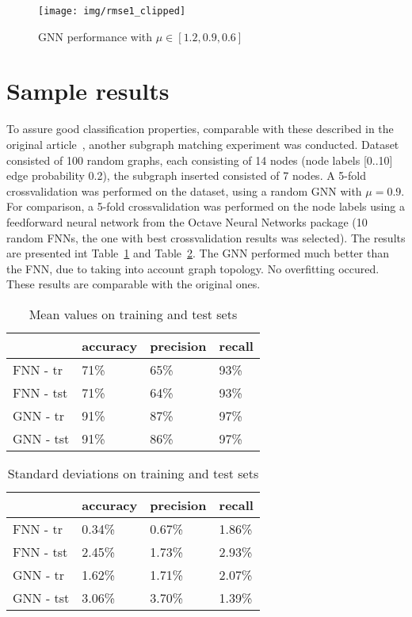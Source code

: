 \documentclass[]{spie}  %
\begin{document}
\begin{figure}
\begin{center}
	\texttt{[image: img/rmse1\_clipped]}
	\caption{GNN performance with $\mu \in [1.2, 0.9, 0.6]$}
	\label{fig:rmse}
\end{center}
\end{figure}

\section{Sample results}
To assure good classification properties, comparable with these described in the original article~\cite{scarselli2009graph}, another subgraph matching experiment was conducted. Dataset consisted of 100 random graphs, each consisting of 14 nodes (node labels [0..10] edge probability 0.2), the subgraph inserted consisted of 7 nodes. A 5-fold crossvalidation was performed on the dataset, using a random GNN with $\mu = 0.9$. For comparison, a 5-fold crossvalidation was performed on the node labels using a feedforward neural network from the Octave Neural Networks package (10 random FNNs, the one with best crossvalidation results was selected). The results are presented int Table~\ref{tab:crossmean} and Table~\ref{tab:crossstd}. The GNN performed much better than the FNN, due to taking into account graph topology. No overfitting occured. These results are comparable with the original ones.

\begin{table}[h!]
	\begin{center}
	\begin{tabular}{llll}
	\toprule
	& accuracy & precision & recall \\
	\midrule
	FNN - tr &	71\% &  65\% & 93\% \\
	FNN - tst &	71\% &  64\% &  93\% \\
	GNN - tr &	91\% &  87\%&  97\% \\
	GNN - tst &	91\% &  86\% &  97\% \\
	\bottomrule
	\end{tabular}
	\caption{Mean values on training and test sets}
	\label{tab:crossmean}
	\end{center}
\end{table}

\begin{table}[h!]
	\begin{center}
	\begin{tabular}{llll}
	\toprule
	& accuracy & precision & recall \\
	\midrule
	FNN - tr &	0.34\% &  0.67\% & 1.86\% \\
	FNN - tst &	2.45\% &  1.73\% &  2.93\% \\
	GNN - tr &	1.62\% &  1.71\% &  2.07\% \\
	GNN - tst &	3.06\% &  3.70\% &  1.39\% \\
	\bottomrule
	\end{tabular}
	\caption{Standard deviations on training and test sets}
	\label{tab:crossstd}
	\end{center}
\end{table}
\end{document}

